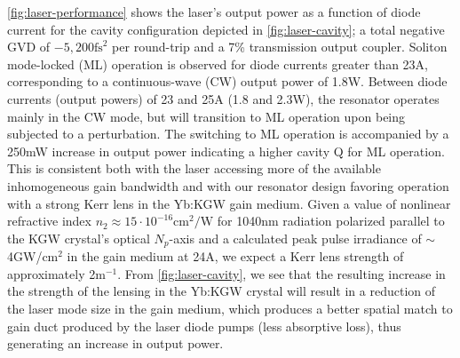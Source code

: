 \ref{fig:laser-performance} shows the laser's output power as a function of diode current for the cavity configuration depicted in \ref{fig:laser-cavity}; a total negative GVD of $-5,200\text{fs}^2$ per round-trip and a 7\% transmission output coupler.
Soliton mode-locked (ML) operation is observed for diode currents greater than 23A, corresponding to a continuous-wave (CW) output power of 1.8W.
Between diode currents (output powers) of 23 and 25A (1.8 and 2.3W), the resonator operates mainly in the CW mode, but will transition to ML operation upon being subjected to a perturbation.
The switching to ML operation is accompanied by a 250mW increase in output
power indicating a higher cavity Q for ML operation.
This is consistent both with the laser accessing more of the available inhomogeneous gain bandwidth and with our resonator design favoring operation with a strong Kerr lens in the Yb:KGW gain medium.
Given a value of nonlinear refractive index $n_2 \approx 15 \cdot 10^{-16}\text{cm}^2/\text{W}$ for 1040nm radiation polarized parallel to the KGW crystal's optical $N_p$-axis \cite{Major_characterization_2003,Selivanov_nonlinear_2006,Vodchits_zscan_2006} and a calculated peak pulse irradiance of $\sim$4GW/cm$^2$ in the gain medium at 24A, we expect a Kerr lens strength of approximately 2m$^{-1}$.
From \ref{fig:laser-cavity}, we see that the resulting increase in the strength of the lensing in the Yb:KGW crystal will result in a reduction of the laser mode size in the gain medium, which produces a better spatial match to gain duct produced by the laser diode pumps (less absorptive loss), thus generating an increase in output power.

